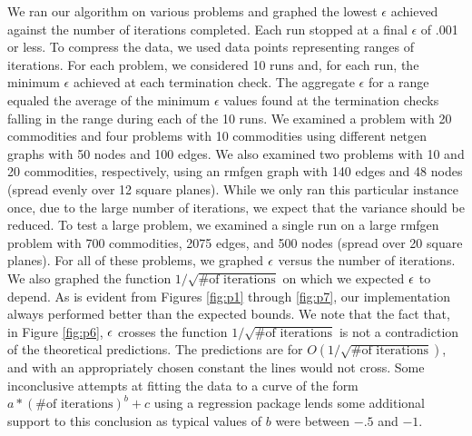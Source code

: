We ran our algorithm on various problems and graphed the lowest $\epsilon$ 
achieved against the number of iterations completed.
Each run stopped at a final $\epsilon$ of .001 or less.
To compress the data, we used data points representing ranges of iterations.
For each problem, we considered 10 runs and, for each run, 
the minimum $\epsilon$ achieved at each termination check.
The aggregate $\epsilon$ for a range equaled the average of the minimum
$\epsilon$ values found at the termination checks falling in the range 
during each of the 10 runs.
We examined a problem with 20 commodities and four problems with 
10 commodities using different {\sc netgen} graphs 
with 50 nodes and 100 edges.  We also examined
two problems with 10 and 20 commodities, respectively,
using an {\sc rmfgen} graph with 140 edges and 48 nodes (spread evenly over
12 square planes).  While we only ran this particular instance once,
due to the large number of iterations, we expect that the variance
should be reduced.
To test a large problem, we examined a single run on a large 
{\sc rmfgen} problem with 700 commodities, 2075 edges, and 500 nodes 
(spread over 20 square planes).
For all of these problems, we graphed $\epsilon$ versus the number of iterations.
We also graphed the function $1/\sqrt{\mbox{\# of iterations}}$ 
on which we expected $\epsilon$ to depend.
As is evident from Figures \ref{fig:p1} through \ref{fig:p7}, 
our implementation always performed better than the expected bounds.
We note that the fact that, in Figure \ref{fig:p6}, $\epsilon$ crosses the
function $1/\sqrt{\mbox{\# of iterations}}$  is not a contradiction of
the theoretical predictions.  The predictions are for
$O(1/\sqrt{\mbox{\# of iterations}})$, and with an appropriately chosen
constant the lines would not cross.
Some inconclusive attempts at fitting the data to a curve of the form 
$a * (\mbox{\# of iterations})^b +c$ using a regression package
lends some additional support to this conclusion as typical values of
$b$ were between $-.5$ and $-1$.

